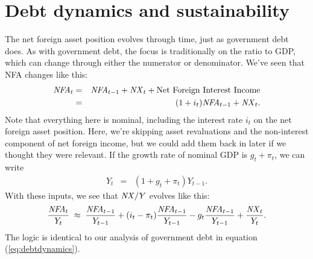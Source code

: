 \section{Debt dynamics and sustainability }

\begin{comment}
There's a natural source of dynamics in net foreign assets,
just as there was with government debt.
Since assets accrue interest, NFA tends to grow over time unless
something is done to counteract it.
In an international context, NFA plays the role of debt.
This is something of a misnomer
because in many countries, the claims of countries on others
include equity and direct investment as well as debt.
File that away for later.
We generally look at NFA relative to GDP, so the question
is which is growing more rapidly.
If the current situation leads the ratio of NFA to GDP to explode,
we say the situation is not sustainable.
\end{comment}

The net foreign asset position evolves through time, just as
government debt does.
As with government debt, the focus is traditionally on
the ratio to GDP, which can change through either the numerator or denominator.
We've seen that NFA changes like this:
\begin{eqnarray*}
    \mbox{\it NFA\/}_{t} &=& \mbox{\it NFA\/}_{t-1} + \mbox{\it NX\/}_{t} +
                \mbox{Net Foreign Interest Income}  \\
                        &=& (1+i_t) \mbox{\it NFA\/}_{t-1} + \mbox{\it NX\/}_t  .
\end{eqnarray*}
Note that everything here is nominal, including the
interest rate $i_t$ on the net foreign asset position.
Here, we're skipping asset revaluations and
the non-interest component of net foreign income,
but we could add them back in later if we thought they were relevant.
If the growth rate of nominal GDP is $g_t + \pi_t$, we can write
\begin{eqnarray*}
    Y_{t} &=& (1+g_t+\pi_t) Y_{t-1} .
\end{eqnarray*}
With these inputs, we see that $\mbox{\em NX\/}/Y$ evolves like this:
\begin{equation}
    \frac{\mbox{\em NFA\/}_{t}}{Y_{t}} \;\approx\;
                \frac{\mbox{\em NFA\/}_{t-1}}{Y_{t-1}}
                +(i_t-\pi_t)  \frac{\mbox{\em NFA\/}_{t-1}}{Y_{t-1}}
                -g_t  \frac{\mbox{\em NFA\/}_{t-1}}{Y_{t-1}}
             +    \frac{\mbox{\em NX\/}_{t}}{Y_{t}} .
\end{equation}
The logic is identical to our analysis of government debt
in equation (\ref{eq:debtdynamics}).


